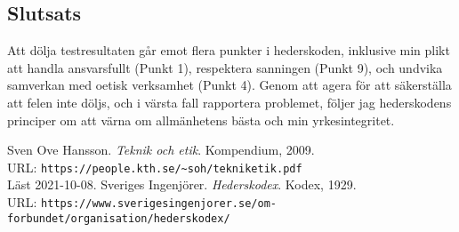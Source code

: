 \documentclass[a4paper,12pt]{article}
\begin{document}
\subsection*{Slutsats}
Att dölja testresultaten går emot flera punkter i hederskoden, inklusive min
plikt att handla ansvarsfullt (Punkt 1), respektera sanningen (Punkt 9), och
undvika samverkan med oetisk verksamhet (Punkt 4). Genom att agera för att
säkerställa att felen inte döljs, och i värsta fall rapportera problemet,
följer jag hederskodens principer om att värna om allmänhetens bästa och min
yrkesintegritet.
\begin{thebibliography}{99}
     Sven Ove Hansson. \emph{Teknik och etik}.  Kompendium, 2009.
    \\
    URL: \verb|https://people.kth.se/~soh/tekniketik.pdf| \\
    Läst 2021-10-08.
     Sveriges Ingenjörer. \emph{Hederskodex}. Kodex, 1929.
    \\
    URL:
    \verb|https://www.sverigesingenjorer.se/om-forbundet/organisation/hederskodex/|
    
\end{thebibliography}
%
\end{document}
